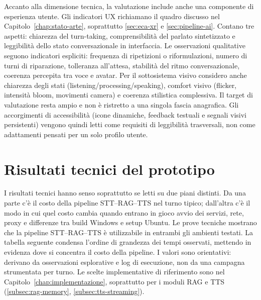 Accanto alla dimensione tecnica, la valutazione include anche una componente di esperienza utente. Gli indicatori UX richiamano il quadro discusso nel Capitolo~\ref{chap:stato-arte}, soprattutto \autoref{sec:eca-xr} e \autoref{sec:pipeline-ai}. Contano tre aspetti: chiarezza del turn-taking, comprensibilità del parlato sintetizzato e leggibilità dello stato conversazionale in interfaccia. Le osservazioni qualitative seguono indicatori espliciti: frequenza di ripetizioni o riformulazioni, numero di turni di riparazione, tolleranza all'attesa, stabilità del ritmo conversazionale, coerenza percepita tra voce e avatar. Per il sottosistema visivo considero anche chiarezza degli stati (listening/processing/speaking), comfort visivo (flicker, intensità bloom, movimenti camera) e coerenza stilistica complessiva. Il target di valutazione resta ampio e non è ristretto a una singola fascia anagrafica. Gli accorgimenti di accessibilità (icone dinamiche, feedback testuali e segnali visivi persistenti) vengono quindi letti come requisiti di leggibilità trasversali, non come adattamenti pensati per un solo profilo utente.

\section{Risultati tecnici del prototipo}
\label{sec:quantitativi}
\noindent I risultati tecnici hanno senso soprattutto se letti su due piani distinti. Da una parte c'è il costo della pipeline STT--RAG--TTS nel turno tipico; dall'altra c'è il modo in cui quel costo cambia quando entrano in gioco avvio dei servizi, rete, proxy e differenze tra build Windows e setup Ubuntu. Le prove tecniche mostrano che la pipeline STT--RAG--TTS è utilizzabile in entrambi gli ambienti testati. La tabella seguente condensa l'ordine di grandezza dei tempi osservati, mettendo in evidenza dove si concentra il costo della pipeline. I valori sono orientativi: derivano da osservazioni esplorative e log di esecuzione, non da una campagna strumentata per turno. Le scelte implementative di riferimento sono nel Capitolo~\ref{chap:implementazione}, soprattutto per i moduli RAG e TTS (\autoref{subsec:rag-memory}, \autoref{subsec:tts-streaming}).

